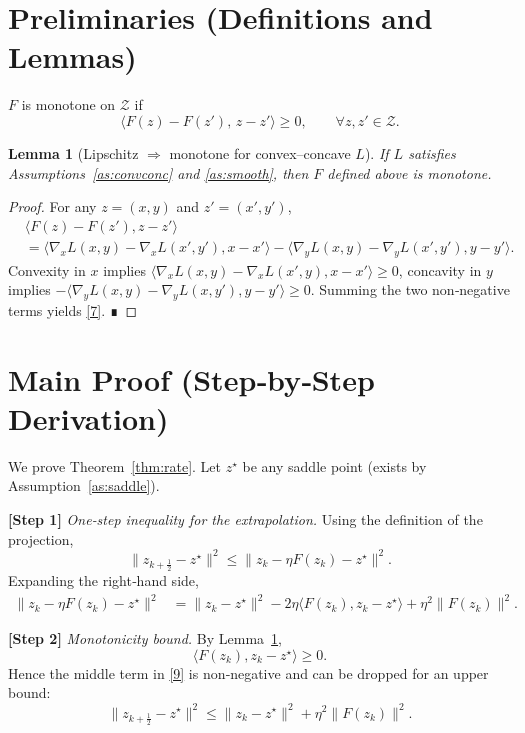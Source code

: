 \documentclass{article}
\newtheorem{lemma}{Lemma}
\begin{document}
\section*{Preliminaries (Definitions and Lemmas)}
\begin{definition}
$F$ is monotone on $\mathcal{Z}$ if
\[
\langle F(z)-F(z'),\,z-z'\rangle\ge0,\qquad\forall z,z'\in\mathcal{Z}.
\tag{7}
\]
\end{definition}
\begin{lemma}[Lipschitz $\Rightarrow$ monotone for convex–concave $L$]\label{lem:mono}
If $L$ satisfies Assumptions~\ref{as:convconc} and \ref{as:smooth}, then $F$ defined above is monotone.
\end{lemma}
\begin{proof}
For any $z=(x,y)$ and $z'=(x',y')$,
\[
\begin{aligned}
&\langle F(z)-F(z'),z-z'\rangle\\
&=\langle\nabla_{x}L(x,y)-\nabla_{x}L(x',y'),x-x'\rangle
   -\langle\nabla_{y}L(x,y)-\nabla_{y}L(x',y'),y-y'\rangle.
\end{aligned}
\]
Convexity in $x$ implies 
$\langle\nabla_{x}L(x,y)-\nabla_{x}L(x',y),x-x'\rangle\ge0$,
concavity in $y$ implies 
$-\langle\nabla_{y}L(x,y)-\nabla_{y}L(x,y'),y-y'\rangle\ge0$.
Summing the two non‑negative terms yields \eqref{7}. ∎
\end{proof}

\section*{Main Proof (Step‑by‑Step Derivation)}
We prove Theorem~\ref{thm:rate}. Let $z^{\star}$ be any saddle point (exists by Assumption~\ref{as:saddle}).

\noindent\textbf{[Step 1]} \emph{One‑step inequality for the extrapolation.}  
Using the definition of the projection,
\[
\|z_{k+\frac12}-z^{\star}\|^{2}
\le\|z_{k}-\eta F(z_{k})-z^{\star}\|^{2}.
\tag{8}
\]
Expanding the right‑hand side,
\[
\begin{aligned}
\|z_{k}-\eta F(z_{k})-z^{\star}\|^{2}
&=\|z_{k}-z^{\star}\|^{2}
   -2\eta\langle F(z_{k}),z_{k}-z^{\star}\rangle
   +\eta^{2}\|F(z_{k})\|^{2}. \tag{9}
\end{aligned}
\]

\noindent\textbf{[Step 2]} \emph{Monotonicity bound.}  
By Lemma~\ref{lem:mono},
\[
\langle F(z_{k}),z_{k}-z^{\star}\rangle\ge0.
\tag{10}
\]
Hence the middle term in \eqref{9} is non‑negative and can be dropped for an upper bound:
\[
\|z_{k+\frac12}-z^{\star}\|^{2}
\le\|z_{k}-z^{\star}\|^{2}+\eta^{2}\|F(z_{k})\|^{2}.
\tag{11}
\]
\end{document}
